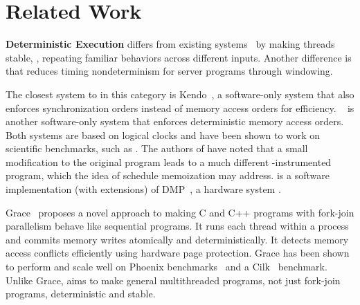 \section{Related Work} \label{sec:related}

\noindent
{\bf Deterministic Execution} \tern differs from existing \dmt
systems~\cite{dmp:asplos09,coredet:asplos10,kendo:asplos09} by making
threads stable, \ie, repeating familiar behaviors across different inputs.
Another difference is that \tern reduces timing nondeterminism for server
programs through windowing.


The closest system to \tern in this category is
Kendo~\cite{kendo:asplos09}, a software-only \dmt system that also
enforces synchronization orders instead of memory access orders for
efficiency.  \coredet~\cite{coredet:asplos10} is another software-only \dmt
system that enforces deterministic memory access orders.  Both systems are
based on logical clocks and have been shown to work on scientific
benchmarks, such as \splash.  The authors of \coredet have noted that a small
modification to the original program leads to a much different
\coredet-instrumented program, which the idea of schedule memoization may
address.  \coredet is a software implementation (with extensions) of
DMP~\cite{dmp:asplos09}, a hardware \dmt system .

Grace~\cite{grace:oopsla09} proposes a novel approach to making C and C++
programs with fork-join parallelism behave like sequential programs.  It
runs each thread within a process and commits memory writes atomically and
deterministically.  It detects memory access conflicts efficiently using
hardware page protection.  Grace has been shown to perform and scale well
on Phoenix benchmarks~\cite{phoenix-benchmarks} and a Cilk~\cite{cilk}
benchmark.  Unlike Grace, \tern aims to make general multithreaded
programs, not just fork-join programs, deterministic and stable.


